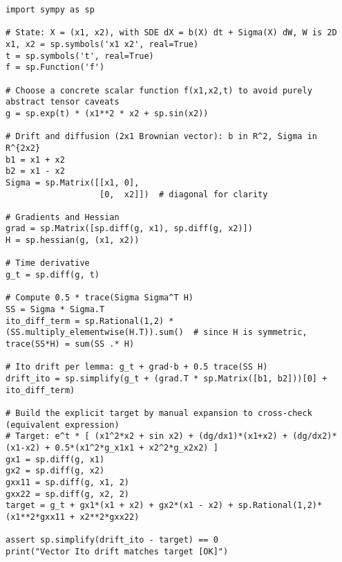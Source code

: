 \documentclass[11pt,letterpaper,oneside]{article}
\begin{document}
\begin{tcolorbox}[sympycheckstyle,title={Vector Itô lemma check (explicit grad/Hessian)}]
\begin{verbatim}
import sympy as sp

# State: X = (x1, x2), with SDE dX = b(X) dt + Sigma(X) dW, W is 2D
x1, x2 = sp.symbols('x1 x2', real=True)
t = sp.symbols('t', real=True)
f = sp.Function('f')

# Choose a concrete scalar function f(x1,x2,t) to avoid purely abstract tensor caveats
g = sp.exp(t) * (x1**2 * x2 + sp.sin(x2))

# Drift and diffusion (2x1 Brownian vector): b in R^2, Sigma in R^{2x2}
b1 = x1 + x2
b2 = x1 - x2
Sigma = sp.Matrix([[x1, 0],
                   [0,  x2]])  # diagonal for clarity

# Gradients and Hessian
grad = sp.Matrix([sp.diff(g, x1), sp.diff(g, x2)])
H = sp.hessian(g, (x1, x2))

# Time derivative
g_t = sp.diff(g, t)

# Compute 0.5 * trace(Sigma Sigma^T H)
SS = Sigma * Sigma.T
ito_diff_term = sp.Rational(1,2) * (SS.multiply_elementwise(H.T)).sum()  # since H is symmetric, trace(SS*H) = sum(SS .* H)

# Ito drift per lemma: g_t + grad·b + 0.5 trace(SS H)
drift_ito = sp.simplify(g_t + (grad.T * sp.Matrix([b1, b2]))[0] + ito_diff_term)

# Build the explicit target by manual expansion to cross-check (equivalent expression)
# Target: e^t * [ (x1^2*x2 + sin x2) + (dg/dx1)*(x1+x2) + (dg/dx2)*(x1-x2) + 0.5*(x1^2*g_x1x1 + x2^2*g_x2x2) ]
gx1 = sp.diff(g, x1)
gx2 = sp.diff(g, x2)
gxx11 = sp.diff(g, x1, 2)
gxx22 = sp.diff(g, x2, 2)
target = g_t + gx1*(x1 + x2) + gx2*(x1 - x2) + sp.Rational(1,2)*(x1**2*gxx11 + x2**2*gxx22)

assert sp.simplify(drift_ito - target) == 0
print("Vector Ito drift matches target [OK]")
\end{verbatim}
\end{tcolorbox}
\end{document}
